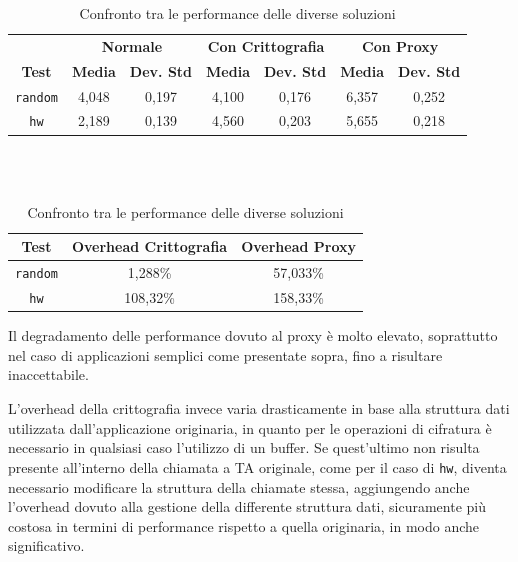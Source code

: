 \documentclass[12pt,italian]{report}
\begin{document}
	\begin{table}[h]
		\centering
		\begin{tabular}{ccccccc}
			\multicolumn{1}{c|}{}                 & 
			\multicolumn{2}{c|}{\textbf{Normale}} & 
			\multicolumn{2}{c|}{\textbf{Con Crittografia}} & 
			\multicolumn{2}{c}{\textbf{Con Proxy}} \\
			
			\multicolumn{1}{c|}{\multirow{-2}{*}{\textbf{Test}}} &
			\multicolumn{1}{c|}{\textbf{Media}}     &
			\multicolumn{1}{c|}{\textbf{Dev. Std}}  &
			\multicolumn{1}{c|}{\textbf{Media}}     &
			\multicolumn{1}{c|}{\textbf{Dev. Std}}  &
			\multicolumn{1}{c|}{\textbf{Media}}     &  
			\multicolumn{1}{c}{\textbf{Dev. Std}}  \\ \hline
			\texttt{random}          & 4,048     & 0,197     & 4,100     & 0,176     & 6,357     & 0,252     \\
			\texttt{hw}    & 2,189     & 0,139     & 4,560     & 0,203     & 5,655     & 0,218     \\
		\end{tabular}
		
		\hfill \\
		\hfill \\
		
		\begin{tabular}{ccc}
			\multicolumn{1}{c|}{\textbf{Test}} & \multicolumn{1}{c|}{\textbf{Overhead Crittografia}} & \multicolumn{1}{c}{\textbf{Overhead Proxy}} \\
			\hline
			\texttt{random}        & 1,288\%   & 57,033\%  \\
			\texttt{hw}  & 108,32\%  & 158,33\%  \\
		\end{tabular}
		
		\caption{ Confronto tra le performance delle diverse soluzioni }
		\label{tab:performance}
	\end{table}
	
	Il degradamento delle performance dovuto al proxy è molto elevato, soprattutto nel caso di applicazioni semplici come presentate sopra, fino a risultare inaccettabile.
	
	L'overhead della crittografia invece varia drasticamente in base alla struttura dati utilizzata dall'applicazione originaria, in quanto per le operazioni di cifratura è necessario in qualsiasi caso l'utilizzo di un buffer. Se quest'ultimo non risulta presente all'interno della chiamata a TA originale, come per il caso di \texttt{hw}, diventa necessario modificare la struttura della chiamate stessa, aggiungendo anche l'overhead dovuto alla gestione della differente struttura dati, sicuramente più costosa in termini di performance rispetto a quella originaria, in modo anche significativo.
	
\end{document}
